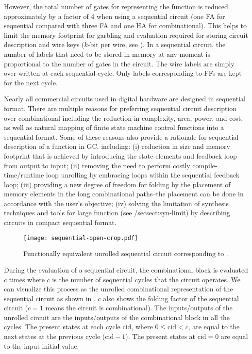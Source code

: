 However, the total number of gates for representing the function is reduced approximately by a factor of 4 when using a sequential circuit (one FA for sequential compared with three FA and one HA for combinational).
This helps to limit the memory footprint for garbling and evaluation required for storing circuit description and wire keys ($k$-bit per wire, see ).
In a sequential circuit, the number of labels that need to be stored in memory at any moment is proportional to the number of gates in the circuit.
The wire labels are simply over-written at each sequential cycle.
Only labels corresponding to FFs are kept for the next cycle.

Nearly all commercial circuits used in digital hardware are designed in sequential format.
There are multiple reasons for preferring sequential circuit description over combinational including the reduction in complexity, area, power, and cost, as well as natural mapping of finite state machine control functions into a sequential format.
Some of these reasons also provide a rationale for sequential description of a function in GC, including: (i) reduction in size and memory footprint that is achieved by introducing the state elements and feedback loop from output to input; (ii) removing the need to perform costly compile-time/runtime loop unrolling by embracing loops within the sequential feedback loop; (iii) providing a new degree of freedom for folding by the placement of memory elements in the long combinational paths--the placement can be done in accordance with the user's objective; (iv) solving the limitation of synthesis techniques and tools for large function (see /sec{sect:syn-limit}) by describing circuits in compact sequential format.

\begin{figure}[ht]
    \centering
	\texttt{[image: sequential-open-crop.pdf]}
	\caption{Functionally equivalent unrolled sequential circuit corresponding to .}
	\label{fig:open-sequential}
\end{figure}

During the evaluation of a sequential circuit, the combinational block is evaluated $c$ times where $c$ is the number of sequential cycles that the circuit operates.
We can visualize this process as the unrolled combinational representation of the sequential circuit as shown in .
$c$ also shows the folding factor of the sequential circuit ($c=1$ means the circuit is combinational).
The inputs/outputs of the unrolled circuit are the inputs/outputs of the combinational block in all the cycles.
The present states at each cycle $\textrm{cid}$, where $0 \le \textrm{cid} < c$, are equal to the next states at the previous cycle ($\textrm{cid}-1$).
The present states at $\textrm{cid}=0$ are equal to the input initial value.

